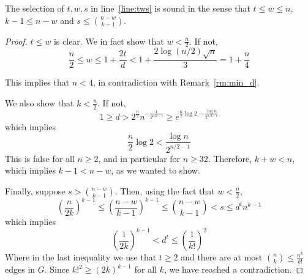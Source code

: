 \begin{lemma}\label{lm:sound}
    The selection of $t, w, s$ in line~\ref{line:tws} is sound in the sense that
    $t  \leq w \leq n$, $k - 1 \leq n - w$ and $s \leq \binom{n - w}{k - 1}$.
    \begin{proof}
        $t \leq w$ is clear.
        We in fact show that $w < \frac{n}{2}$.
        If not,
        \[
            \frac{n}{2} \leq
            w \leq 1 + \frac{2t}{d} <
            1 + \frac{2 \log (n/2) \sqrt{n}}{3} = %
            1 + \frac{n}{4}
        \]

        This implies that $n < 4$, in contradiction with Remark~\ref{rm:min_d}.



        We also show that $k < \frac{n}{2}$.
        If not,
        \[
            1 \geq
            d >
            2^{\frac{n}{2}} n^{-\frac{1}{2^{n/2-1}}} \geq
            e^{\frac{n}{2} \log 2 - \frac{\log n}{2^{n/2-1}}}
        \]
        which implies
        \[
            \frac{n}{2} \log 2 < \frac{\log n}{2^{n/2-1}}
        \]
        This is false for all $n \geq 2$, and in particular for $n \geq 32$.
        Therefore, $ k + w < n$, which implies $k - 1 < n - w$,
        as we wanted to show.

        Finally, suppose $s > \binom{n - w}{k - 1}$.
        Then, using the fact that $w < \frac{n}{2}$,
        \[
            \left( \frac{n}{2k} \right)^{k-1} \leq
            \left( \frac{n-w}{k-1} \right)^{k-1} \leq
            \binom{n - w}{k - 1} < s \leq d^t n^{k-1}
        \]
        which implies
        \[
            \left( \frac{1}{2k} \right)^{k-1} < d^t \leq
            \left( \frac{1}{k!} \right)^2
        \]
        Where in the last inequality we use that $t \geq 2$ and there are at most
        $\binom{n}{k} \leq \frac{n^k}{k!}$ edges in $G$.
        Since $k!^2 \geq (2k)^{k-1}$ for all $k$,
        we have reached a contradiction. \qedhere

    \end{proof}
\end{lemma}

